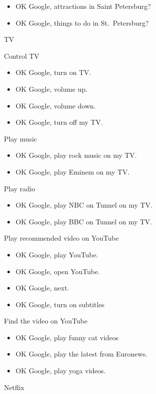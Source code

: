 \documentclass[
  letterpaper,
  DIV=11,
  numbers=noendperiod]{scrartcl}
\begin{document}
\begin{itemize}
\item
  OK Google, attractions in Saint Petersburg?
\item
  OK Google, things to do in St.~Petersburg?
\end{itemize}

TV

Control TV

\begin{itemize}
\item
  OK Google, turn on TV.
\item
  OK Google, volume up.
\item
  OK Google, volume down.
\item
  OK Google, turn off my TV.
\end{itemize}

Play music

\begin{itemize}
\item
  OK Google, play rock music on my TV.
\item
  OK Google, play Eminem on my TV.
\end{itemize}

Play radio

\begin{itemize}
\item
  OK Google, play NBC on Tunnel on my TV.
\item
  OK Google, play BBC on Tunnel on my TV.
\end{itemize}

Play recommended video on YouTube

\begin{itemize}
\item
  OK Google, play YouTube.
\item
  OK Google, open YouTube.
\item
  OK Google, next.
\item
  OK Google, turn on subtitles
\end{itemize}

Find the video on YouTube

\begin{itemize}
\item
  OK Google, play funny cat videos
\item
  OK Google, play the latest from Euronews.
\item
  OK Google, play yoga videos.
\end{itemize}

Netflix
\end{document}
